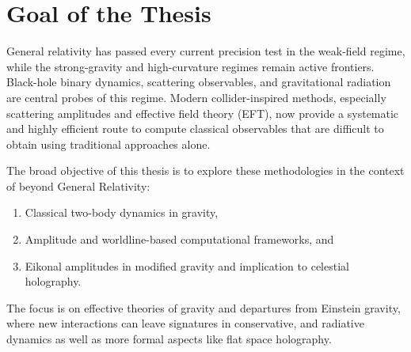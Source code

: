 \section*{Goal of the Thesis}
General relativity has passed every current precision test in the weak-field regime, while the strong-gravity and high-curvature regimes remain active frontiers. Black-hole binary dynamics, scattering observables, and gravitational radiation are central probes of this regime. Modern collider-inspired methods, especially scattering amplitudes and effective field theory (EFT), now provide a systematic and highly efficient route to compute classical observables that are difficult to obtain using traditional approaches alone.

The broad objective of this thesis is to explore these methodologies in the context of beyond General Relativity:
\begin{enumerate}
\item Classical two-body dynamics in gravity,
\item Amplitude and worldline-based computational frameworks, and
\item Eikonal amplitudes in modified gravity and implication to celestial holography.
\end{enumerate}
The focus is on effective theories of gravity and departures from Einstein gravity, where new interactions can leave signatures in conservative, and radiative dynamics as well as more formal aspects like flat space holography.
